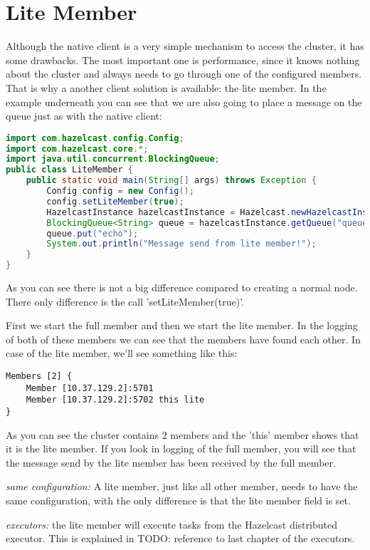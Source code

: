 \section{Lite Member}
Although the native client is a very simple mechanism to access the cluster, it has some drawbacks. The most important one is performance, since it knows nothing about the cluster and always needs to go through one of the configured members. That is why a another client solution is available: the lite member. In the example underneath you can see that we are also going to place a message on the queue just as with the native client:
\begin{lstlisting}[language=java]
import com.hazelcast.config.Config;
import com.hazelcast.core.*;
import java.util.concurrent.BlockingQueue;
public class LiteMember {
    public static void main(String[] args) throws Exception {
        Config config = new Config();
        config.setLiteMember(true);
        HazelcastInstance hazelcastInstance = Hazelcast.newHazelcastInstance(config);
        BlockingQueue<String> queue = hazelcastInstance.getQueue("queue");
        queue.put("echo");
        System.out.println("Message send from lite member!");
    }
}
\end{lstlisting}
As you can see there is not a big difference compared to creating a normal node. There only difference is the call 'setLiteMember(true)'. 

First we start the full member and then we start the lite member. In the logging of both of these members we can see that the members have found each other. In case of the lite member, we'll see something like this:
\begin{verbatim}
Members [2] {
    Member [10.37.129.2]:5701
    Member [10.37.129.2]:5702 this lite
}	
\end{verbatim}	
As you can see the cluster contains 2 members and the 'this' member shows that it is the lite member. If you look in logging of the full member, you will see that the message send by the lite member has been received by the full member.

\emph{same configuration:} A lite member, just like all other member, needs to have the same configuration, with the only difference is that the lite member field is set.

\emph{executors:} the lite member will execute tasks from the Hazelcast distributed executor. This is explained in TODO: reference to last chapter of the executors.

